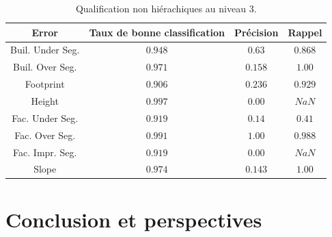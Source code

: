 \documentclass[a4paper,french]{article}
\begin{document}
    \begin{table}[H]
        \begin{center}
            \caption{\label{tab::multilab_d3}Qualification non hiérachiques au niveau $3$.}
            \begin{tabular}{c c c c}
                \toprule
                {\bf Error} & {\bf Taux de bonne classification} & {\bf Précision} & {\bf Rappel} \\
                \midrule
                Buil. Under Seg. & $0.948$ & $0.63$ & $0.868$ \\
                \midrule
                Buil. Over Seg. & $0.971$ & $0.158$ & $1.00$ \\
                \midrule
                Footprint & $0.906$ & $0.236$ & $0.929$ \\
                \midrule
                Height & $0.997$ & $0.00$ & $NaN$ \\
                \midrule
                Fac. Under Seg. & $0.919$ & $0.14$ & $0.41$ \\
                \midrule
                Fac. Over Seg. & $0.991$ & $1.00$ & $0.988$ \\
                \midrule
                Fac. Impr. Seg. & $0.919$ & $0.00$ & $NaN$\\
                \midrule
                Slope & $0.974$ & $0.143$ & $1.00$\\
                \bottomrule
            \end{tabular}
        \end{center}
    \end{table}

    \section{Conclusion et perspectives}

    
    
\end{document}
